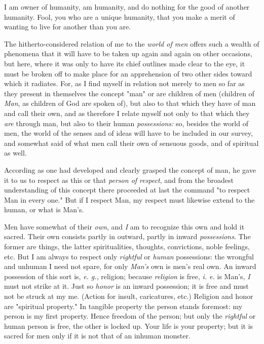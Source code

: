 I am owner of humanity, am humanity, and do nothing for the good of another 
humanity. Fool, you who are a unique humanity, that you make a merit of 
wanting to live for another than you are.

The hitherto-considered relation of me to the \textit{world of men} offers 
such a wealth of phenomena that it will have to be taken up again and again on 
other occasions, but here, where it was only to have its chief outlines made 
clear to the eye, it must be broken off to make place for an apprehension of 
two other sides toward which it radiates. For, as I find myself in relation 
not merely to men so far as they present in themselves the concept "{}man"{} 
or are children of men (children of \textit{Man}, as children of God are 
spoken of), but also to that which they have of man and call their own, and as 
therefore I relate myself not only to that which they \textit{are} through 
man, but also to their human \textit{possessions:} so, besides the world of 
men, the world of the senses and of ideas will have to be included in our 
survey, and somewhat said of what men call their own of sensuous goods, and of 
spiritual as well.

According as one had developed and clearly grasped the concept of man, he gave 
it to us to respect as this or that \textit{person of respect}, and from the 
broadest understanding of this concept there proceeded at last the command 
"{}to respect Man in every one."{} But if I respect Man, my respect must 
likewise extend to the human, or what is Man's.

Men have somewhat of their \textit{own}, and \textit{I} am to recognize this 
own and hold it sacred. Their own consists partly in outward, partly in inward 
\textit{possessions}. The former are things, the latter spiritualities, 
thoughts, convictions, noble feelings, etc. But I am always to respect only 
\textit{rightful} or \textit{human} possessions: the wrongful and unhuman I 
need not spare, for only \textit{Man's} own is men's real own. An inward 
possession of this sort is, \textit{e. g.}, religion; because 
\textit{religion} is free, \textit{i. e.} is Man's, \textit{I} must not strike 
at it. Just so \textit{honor} is an inward possession; it is free and must not 
be struck at my me. (Action for insult, caricatures, etc.) Religion and honor 
are "{}spiritual property."{} In tangible property the person stands foremost: 
my person is my first property. Hence freedom of the person; but only the 
\textit{rightful} or human person is free, the other is locked up. Your life 
is your property; but it is sacred for men only if it is not that of an 
inhuman monster.


